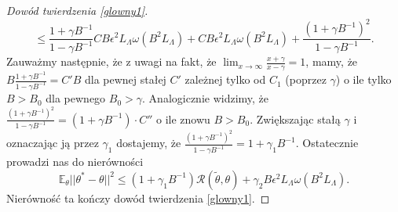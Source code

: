 \documentclass{article}
\begin{document}
\begin{proof}[Dowód twierdzenia \ref{glowny1}]
\begin{displaymath}
\leq \frac{1+\gamma B^{-1}}{1-\gamma B^{-1}}CB\epsilon^2L_{\Lambda}\omega (B^2L_{\Lambda})+CB\epsilon^2L_{\Lambda}\omega (B^2L_{\Lambda})+\frac{(1+\gamma B^{-1})^2}{1-\gamma B^{-1}}.
\end{displaymath}
Zauważmy następnie, że z uwagi na fakt, że $\lim_{x\to \infty}\frac{x+\gamma}{x-\gamma}=1$, mamy, że 
$B\frac{1+\gamma B^{-1}}{1-\gamma B^{-1}}=C'B$ dla pewnej stałej $C'$ zależnej tylko od $C_1$ (poprzez $\gamma$) o ile tylko $B>B_0$ dla pewnego $B_0>\gamma$. Analogicznie widzimy, że  $\frac{(1+\gamma B^{-1})^2}{1-\gamma B^{-1}}=(1+\gamma B^{-1})\cdot C''$ o ile znowu $B>B_0$. Zwiększając stałą $\gamma$ i oznaczając ją przez $\gamma_1$ dostajemy, że $\frac{(1+\gamma B^{-1})^2}{1-\gamma B^{-1}}=1+\gamma_1B^{-1}$. Ostatecznie prowadzi nas do nierówności 
\begin{displaymath}
\mathbb{E}_{\theta}||\theta^*-\theta||^2\leq (1+\gamma_1B^{-1})\mathcal{R}(\tilde{\theta},\theta)+\gamma_2B\epsilon^2L_{\Lambda}\omega (B^2L_{\Lambda}).
\end{displaymath}
Nierówność ta kończy dowód twierdzenia \ref{glowny1}.
\end{proof}
\end{document}

